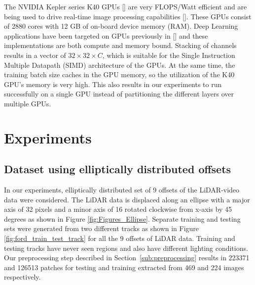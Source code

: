 \documentclass{article}
\begin{document}
The NVIDIA Kepler series K40 GPUs [\cite{NVIDIA-Inc.2012NVIDIAs-Ne}] are very FLOPS/Watt efficient and are being used to drive real-time image processing capabilities [\cite{Venugopal2013Accelerati}]. These GPUs consist of 2880 cores with 12 GB of on-board device memory (RAM). Deep Learning applications have been targeted on GPUs previously in [\cite{Krizhevsky2012Imagenet-C}] and these implementations are both compute and memory bound. Stacking of channels results in a vector of $32 \times 32 \times \mathit{C}$, which is suitable for the Single Instruction Multiple Datapath (SIMD) architecture of the GPUs. At the same time, the training batch size caches in the GPU memory, so the utilization of the K40 GPU's memory is very high. This also results in our experiments to run successfully on a single GPU instead of partitioning the different layers over multiple GPUs.
 


\section{Experiments} %
\label{sec:experiments}

\subsection{Dataset using elliptically distributed offsets} %
\label{sub:dataset_using_elliptically_distributed_offsets}


In our experiments, elliptically distributed set of 9 offsets of the LiDAR-video data were considered. The LiDAR data is displaced along an ellipse with a major axis of 32 pixels and a minor axis of 16 rotated clockwise from x-axis by 45 degrees as shown in Figure \ref{fig:Figures_Ellipse}. Separate training and testing sets were generated from two different tracks as shown in Figure \ref{fig:ford_train_test_track} for all the 9 offsets of LiDAR data. Training and testing tracks have never seen regions and also have different lighting conditions. Our preprocessing step described in Section~\ref{sub:preprocessing} results in 223371 and 126513 patches for testing and training extracted from 469 and 224 images respectively.
\end{document}
